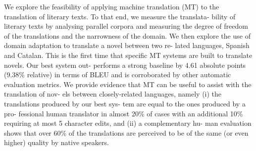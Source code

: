 We explore the feasibility of applying machine translation (MT) to the translation of literary texts. To that end, we measure the translata- bility of literary texts by analysing parallel corpora and measuring the degree of freedom of the translations and the narrowness of the domain. We then explore the use of domain adaptation to translate a novel between two re- lated languages, Spanish and Catalan. This is the first time that specific MT systems are built to translate novels. Our best system out- performs a strong baseline by 4.61 absolute points (9.38\% relative) in terms of BLEU and is corroborated by other automatic evaluation metrics. We provide evidence that MT can be useful to assist with the translation of nov- els between closely-related languages, namely (i) the translations produced by our best sys- tem are equal to the ones produced by a pro- fessional human translator in almost 20\% of cases with an additional 10\% requiring at most 5 character edits, and (ii) a complementary hu- man evaluation shows that over 60\% of the translations are perceived to be of the same (or even higher) quality by native speakers.
